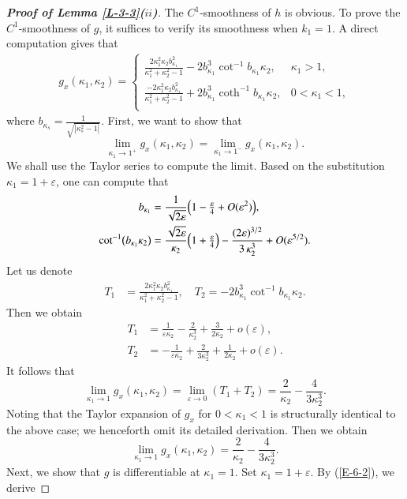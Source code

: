 \documentclass[11pt,leqno]{article}
\numberwithin{equation}{section}
\theoremstyle{definition}
\begin{document}
\begin{proof}[\textbf{Proof of Lemma \ref{L-3-3}($ii$)}]

The $C^1$-smoothness of $h$ is obvious. To prove the $C^1$-smoothness of $g$,  it suffices to verify its smoothness when $k_1=1$. A direct computation gives that
\begin{equation}\label{E-6-1}\begin{aligned}
g_x(\kappa_1,\kappa_2)=\begin{cases}
\frac{2\kappa_1^2\kappa_2b^2_{\kappa_1}}{\kappa_1^2+\kappa_2^2-1}-2b_{\kappa_1}^3\cot^{-1}b_{\kappa_1}\kappa_2, & \kappa_1>1,\\[1em]
\frac{-2\kappa_1^2\kappa_2b^2_{\kappa_1}}{\kappa_1^2+\kappa_2^2-1}+2b_{\kappa_1}^3\coth^{-1}b_{\kappa_1}\kappa_2, & 0<\kappa_1<1,\\
\end{cases}
\end{aligned}\end{equation}
where $b_{\kappa_s}=\frac{1}{\sqrt{|\kappa_s^2-1|}}$. First, we want to show that
\[\lim_{\kappa_1\to 1^+}g_x(\kappa_1,\kappa_2)=\lim_{\kappa_1\to 1^-}g_x(\kappa_1,\kappa_2).\]
We shall use the Taylor series to compute the limit.
Based on the substitution $\kappa_1=1+\varepsilon$, one can compute that
\begin{equation}\label{E-6-2}\begin{aligned}
b_{\kappa_1}
&=\frac{1}{\sqrt{2\varepsilon}}\Bigl(1 - \tfrac{\varepsilon}{4} + O(\varepsilon^2)\Bigr),\\
\cot^{-1}\bigl(b_{\kappa_1}\kappa_2\bigr)
&=\frac{\sqrt{2\varepsilon}}{\kappa_2}\Bigl(1 + \tfrac{\varepsilon}{4}\Bigr)
- \frac{(2\varepsilon)^{3/2}}{3\,\kappa_2^3}
+ O(\varepsilon^{5/2}).
\end{aligned}\end{equation}
Let us denote
\[\begin{aligned}T_1&=\frac{2\kappa_1^2\kappa_2b^2_{\kappa_1}}{\kappa_1^2+\kappa_2^2-1},\quad T_2=-2b_{\kappa_1}^3\cot^{-1}b_{\kappa_1}\kappa_2.\end{aligned}\]
Then we obtain
\[\begin{aligned}T_1
&=\frac{1}{\varepsilon \kappa_2}-\frac{2}{\kappa_2^3}+\frac{3}{2\kappa_2}+o(\varepsilon),\\
T_2
&=-\frac{1}{\varepsilon \kappa_2}+\frac{2}{3\kappa_2^3}+\frac{1}{2\kappa_2}+o(\varepsilon).\end{aligned}\]
It follows that
\[\lim_{\kappa_1\to 1}g_x(\kappa_1,\kappa_2)=\lim_{\varepsilon\to 0} (T_1+T_2)=\frac{2}{\kappa_2}-\frac{4}{3\kappa^3_2}.\]
Noting that the Taylor expansion of $g_x$ for $0<\kappa_1<1$ is structurally identical to the above case; we henceforth omit its detailed derivation. Then we obtain
\begin{equation}\label{E-6-3}\lim_{\kappa_1\to 1}g_x(\kappa_1,\kappa_2)=\frac{2}{\kappa_2}-\frac{4}{3\kappa^3_2}.\end{equation}
Next, we show that $g$ is differentiable at $\kappa_1=1$. Set $\kappa_1=1+\varepsilon$. By (\ref{E-6-2}), we derive


\end{proof}
\end{document}
